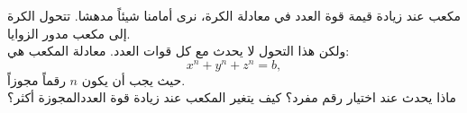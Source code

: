 \begin{surferPage}[مكعب]{مكعب}
عند زيادة قيمة قوة العدد في معادلة الكرة، نرى أمامنا شيئاً مدهشا. تتحول الكرة إلى مكعب مدور الزوايا.\\
\vspace{0.3cm}
ولكن هذا التحول لا يحدث مع كل قوات العدد. معادلة المكعب هي:
\[x^n+y^n+z^n=b,\]
حيث يجب أن يكون $n$ رقماً مجوزاً.\\
\vspace{0.3cm}
ماذا يحدث عند اختيار رقم مفرد؟ كيف يتغير المكعب عند زيادة قوة العددالمجوزة أكثر؟
\end{surferPage}